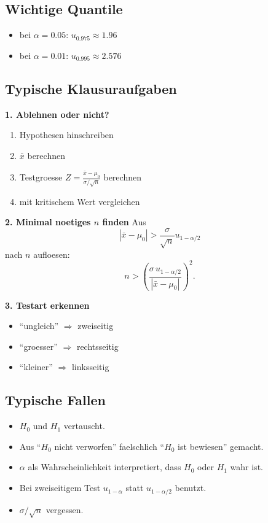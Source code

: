 \documentclass[a4paper,11pt]{article}
\begin{document}
\subsection{Wichtige Quantile}
\begin{itemize}
  \item bei $\alpha=0.05$: $u_{0.975}\approx 1.96$
  \item bei $\alpha=0.01$: $u_{0.995}\approx 2.576$
\end{itemize}

\subsection{Typische Klausuraufgaben}
\textbf{1. Ablehnen oder nicht?}
\begin{enumerate}
  \item Hypothesen hinschreiben
  \item $\bar x$ berechnen
  \item Testgroesse $Z=\frac{\bar x-\mu_0}{\sigma/\sqrt n}$ berechnen
  \item mit kritischem Wert vergleichen
\end{enumerate}

\textbf{2. Minimal noetiges $n$ finden}
Aus
\[
|\bar x-\mu_0|>\frac{\sigma}{\sqrt n}u_{1-\alpha/2}
\]
nach $n$ aufloesen:
\[
n>\left(\frac{\sigma\,u_{1-\alpha/2}}{|\bar x-\mu_0|}\right)^2.
\]

\textbf{3. Testart erkennen}
\begin{itemize}
  \item ``ungleich'' $\Rightarrow$ zweiseitig
  \item ``groesser'' $\Rightarrow$ rechtsseitig
  \item ``kleiner'' $\Rightarrow$ linksseitig
\end{itemize}

\subsection{Typische Fallen}
\begin{itemize}
  \item $H_0$ und $H_1$ vertauscht.
  \item Aus ``$H_0$ nicht verworfen'' faelschlich ``$H_0$ ist bewiesen'' gemacht.
  \item $\alpha$ als Wahrscheinlichkeit interpretiert, dass $H_0$ oder $H_1$ wahr ist.
  \item Bei zweiseitigem Test $u_{1-\alpha}$ statt $u_{1-\alpha/2}$ benutzt.
  \item $\sigma/\sqrt n$ vergessen.
\end{itemize}
\end{document}
